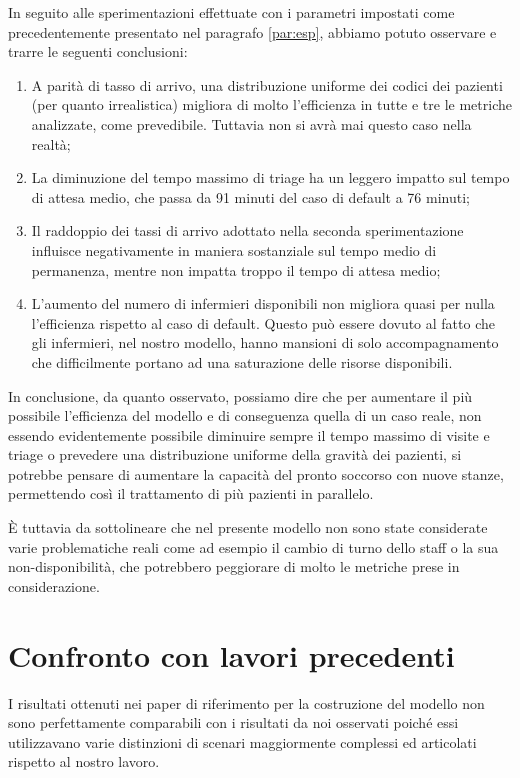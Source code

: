 In seguito alle sperimentazioni effettuate con i parametri impostati come precedentemente presentato nel paragrafo \ref{par:esp}, abbiamo potuto osservare e trarre le seguenti conclusioni: 

\begin{enumerate}
    \item A parità di tasso di arrivo, una distribuzione uniforme dei codici dei pazienti (per quanto irrealistica) migliora di molto l'efficienza in tutte e tre le metriche analizzate, come prevedibile. Tuttavia non si avrà mai questo caso nella realtà;
    \item La diminuzione del tempo massimo di triage ha un leggero impatto sul tempo di attesa medio, che passa da 91 minuti del caso di default a 76 minuti;
    \item Il raddoppio dei tassi di arrivo adottato nella seconda sperimentazione influisce negativamente in maniera sostanziale sul tempo medio di permanenza, mentre non impatta troppo il tempo di attesa medio;
    \item L'aumento del numero di infermieri disponibili non migliora quasi per nulla l'efficienza rispetto al caso di default. Questo può essere dovuto al fatto che gli infermieri, nel nostro modello, hanno mansioni di solo accompagnamento che difficilmente portano ad una saturazione delle risorse disponibili.  
\end{enumerate}

In conclusione, da quanto osservato, possiamo dire che per aumentare il più possibile l'efficienza del modello e di conseguenza quella di un caso reale, non essendo evidentemente possibile diminuire sempre il tempo massimo di visite e triage o prevedere una distribuzione uniforme della gravità dei pazienti, si potrebbe pensare di aumentare la capacità del pronto soccorso con nuove stanze, permettendo così il trattamento di più pazienti in parallelo. 

È tuttavia da sottolineare che nel presente modello non sono state considerate varie problematiche reali come ad esempio il cambio di turno dello staff o la sua non-disponibilità, che potrebbero peggiorare di molto le metriche prese in considerazione. 

\section{Confronto con lavori precedenti}

I risultati ottenuti nei paper di riferimento per la costruzione del modello non sono perfettamente comparabili con i risultati da noi osservati poiché essi utilizzavano varie distinzioni di scenari maggiormente complessi ed articolati rispetto al nostro lavoro.

